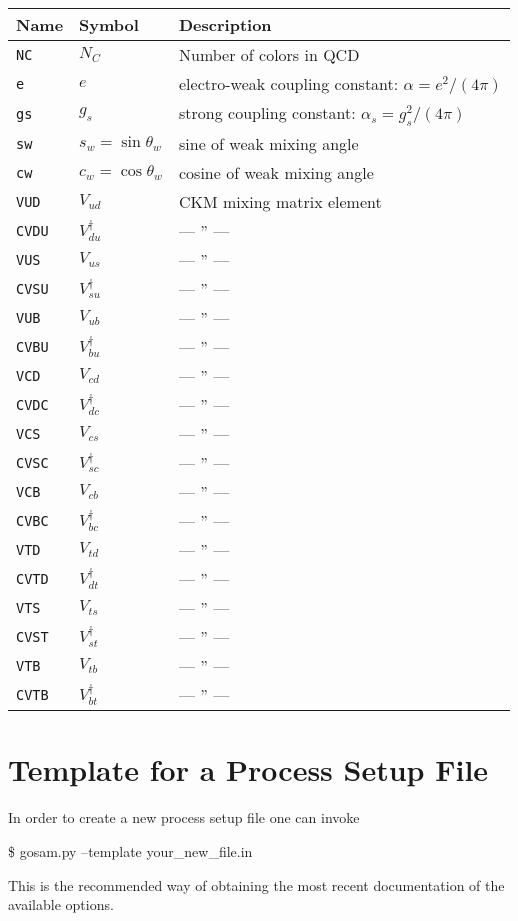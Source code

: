\documentclass[11pt,a4paper]{refrep}
\begin{document}
\medskip
\begin{tabular}{|l|l|l|}
\hline
Name & Symbol & Description\\
\hline
\tt NC & $N_C$ & Number of colors in QCD\\
\tt e & $e$ & electro-weak coupling constant: $\alpha=e^2/(4\pi)$\\
\tt gs & $g_s$ & strong coupling constant: $\alpha_s=g_s^2/(4\pi)$\\
\tt sw & $s_w=\sin\theta_w$ & sine of weak mixing angle\\
\tt cw & $c_w=\cos\theta_w$ & cosine of weak mixing angle\\
\tt VUD & $V_{ud}$ & CKM mixing matrix element\\
\tt CVDU & $V_{du}^{\dagger}$ & --- '' ---\\
\tt VUS & $V_{us}$ & --- '' ---\\
\tt CVSU & $V_{su}^{\dagger}$ & --- '' ---\\
\tt VUB & $V_{ub}$ & --- '' ---\\
\tt CVBU & $V_{bu}^{\dagger}$ & --- '' ---\\
\tt VCD & $V_{cd}$ & --- '' ---\\
\tt CVDC & $V_{dc}^{\dagger}$ & --- '' ---\\
\tt VCS & $V_{cs}$ & --- '' ---\\
\tt CVSC & $V_{sc}^{\dagger}$ & --- '' ---\\
\tt VCB & $V_{cb}$ & --- '' ---\\
\tt CVBC & $V_{bc}^{\dagger}$ & --- '' ---\\
\tt VTD & $V_{td}$ & --- '' ---\\
\tt CVTD & $V_{dt}^{\dagger}$ & --- '' ---\\
\tt VTS & $V_{ts}$ & --- '' ---\\
\tt CVST & $V_{st}^{\dagger}$ & --- '' ---\\
\tt VTB & $V_{tb}$ & --- '' ---\\
\tt CVTB & $V_{bt}^{\dagger}$ & --- '' ---\\
\hline
\end{tabular}

\chapter{Template for a Process Setup File}
\label{chp:appendix-template.in}
In order to create a new process setup file one can invoke
\begin{example}
\$ gosam.py --template your\_new\_file.in
\end{example}
This is the recommended way of obtaining the most recent
documentation of the available options.
\end{document}
